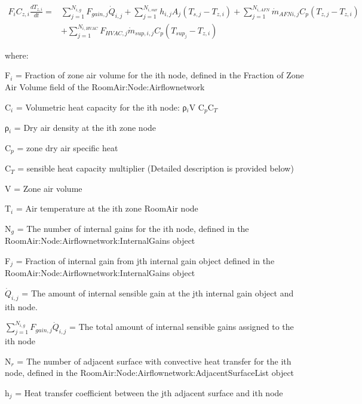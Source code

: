 \begin{equation}
\begin{split}
{F_i}{C_{z,i}}\frac{{d{T_{z,i}}}}{{dt}} =& \sum\limits_{j = 1}^{{N_{i,g}}} {{F_{gain,j}{\dot Q}_{i,j}}}  + \sum\limits_{j = 1}^{{N_{i,sur}}} {{h_{i,j}}} {A_j}\left( {{T_{s,j}} - {T_{z,i}}} \right) + \sum\limits_{j = 1}^{{N_{i,AFN}}} {{{\dot m}_{AFN i,j}}} {C_p}\left( {{T_{z,j}} - {T_{z,i}}} \right)\, \\
&+ \sum\limits_{j = 1}^{{N_{i,HVAC}}} {{{F_{HVAC,j}}{\dot m}_{sup,i,j}}} {C_p}\left( {{T_{sup_j}} - {T_{z,i}}} \right)
\end{split}
\end{equation}

where:

F\(_{i}\) = Fraction of zone air volume for the ith node, defined in the Fraction of Zone Air Volume field of the RoomAir:Node:Airflownetwork

C\(_{i}\) = Volumetric heat capacity for the ith node: ρ\(_{i}\)V C\(_{p}\)C\(_{T}\)

ρ\(_{i}\) = Dry air density at the ith zone node

C\(_{p}\) = zone dry air specific heat

C\(_{T}\) = sensible heat capacity multiplier (Detailed description is provided below)

V = Zone air volume

T\(_{i}\) = Air temperature at the ith zone RoomAir node

N\(_{g}\) = The number of internal gains for the ith node, defined in the \\ RoomAir:Node:Airflownetwork:InternalGains object

F\(_{j}\) = Fraction of internal gain from jth internal gain object defined in the \\ RoomAir:Node:Airflownetwork:InternalGains object

\({\dot Q}_{i,j}\) = The amount of internal sensible gain at the jth internal gain object and ith node.

\({\sum\limits_{j = 1}^{N_{i,g}} F_{gain,j}{\dot Q}_{i,j}}\) = The total amount of internal sensible gains assigned to the ith node

N\(_{r}\) = The number of adjacent surface with convective heat transfer for the ith node, defined in the RoomAir:Node:Airflownetwork:AdjacentSurfaceList object

h\(_{j}\) = Heat transfer coefficient between the jth adjacent surface and ith node

